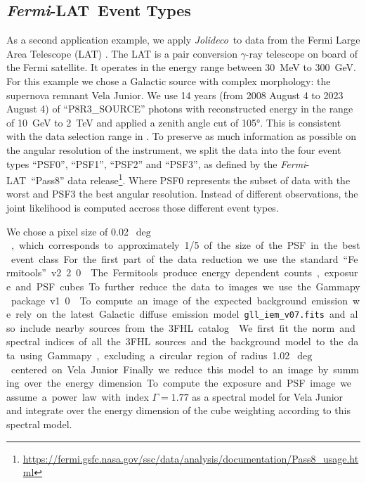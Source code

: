\documentclass[twocolumn]{aastex631}
\newcommand{\fermi}{\textit{Fermi}-LAT~}
\newcommand{\jolideco}{\textit{Jolideco}~}
\newcommand{\gammaray}{$\gamma$-ray\xspace}
\begin{document}
    \subsection{\fermi Event Types}
    \label{sec:fermi-lat-example}
     As a second application example, we apply \jolideco  to data from the Fermi Large Area Telescope (LAT) \citep{Atwood2009}. The LAT is a pair conversion \gammaray telescope on board of the Fermi satellite. It operates in the energy range between \qty[mode = text]{30}{MeV} to  \qty[mode = text]{300}{GeV}. For this example we chose  a Galactic source with complex morphology: the supernova remnant Vela Junior. We use 14 years (from 2008 August 4 to 2023 August 4) of \enquote{P8R3\_SOURCE} photons with reconstructed energy in the range of \qty[mode = text]{10}{GeV} to \qty[mode = text]{2}{TeV} and applied a zenith angle cut of \ang{105}. This is consistent with the data selection range in \cite{Ackermann2017}. To preserve as much information as possible on the angular resolution of the instrument, we split the data into the four event types \enquote{PSF0}, \enquote{PSF1}, \enquote{PSF2} and \enquote{PSF3}, as defined by the \fermi \enquote{Pass8} data release\footnote{\url{https://fermi.gsfc.nasa.gov/ssc/data/analysis/documentation/Pass8_usage.html}}. Where PSF0 represents the subset of data with the worst and PSF3 the best angular resolution. Instead of different observations, the joint likelihood is computed accross those different event types.
     
     We chose a pixel size of \qty[mode = text]{0.02}{$\deg$}, which corresponds to approximately 1/5 of the size of the PSF in the best event class. For the first part of the data reduction we use the standard \enquote{Fermitools} v2.2.0 \citep{Fermitools2019}.
    
    The Fermitools produce energy dependent counts, exposure and PSF cubes. To further reduce the data to images we use the Gammapy package v1.0 \citep{GammapyZenodov1.0.1, Gammapy2023}. To compute an image of the expected background emission we rely on the latest Galactic diffuse emission model \texttt{gll\_iem\_v07.fits} and also include nearby sources from the 3FHL catalog \citep{Ajello2017}. We first fit the norm and spectral indices of all the 3FHL sources and the background model to the data using Gammapy, excluding a circular region of radius \qty[mode = text]{1.02}{$\deg$} centered on Vela Junior. Finally we reduce this model to an image by summing over the energy dimension. To compute the exposure and PSF image we assume a power law with index $\Gamma=1.77$ \citep{Ajello2017} as a spectral model for Vela Junior and integrate over the energy dimension of the cube weighting according to this spectral model.
    
\end{document}
